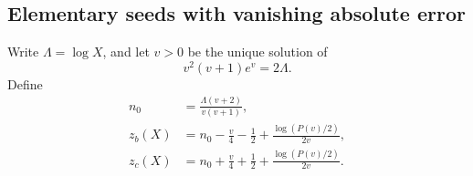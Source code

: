\subsection{Elementary seeds with vanishing absolute error}
Write $\Lambda=\log X$, and let $v>0$ be the unique solution of
\begin{equation}\label{pdt:eq:veq}
 v^2(v+1)e^v=2\Lambda.
\end{equation}
Define
\begin{equation}\label{pdt:eq:seeds}
 \begin{split}
 n_0&=\frac{\Lambda(v+2)}{v(v+1)},\\
 z_b(X)&=n_0-\frac v4-\frac12+\frac{\log(P(v)/2)}{2v},\\
 z_c(X)&=n_0+\frac v4+\frac12+\frac{\log(P(v)/2)}{2v}.
 \end{split}
\end{equation}

